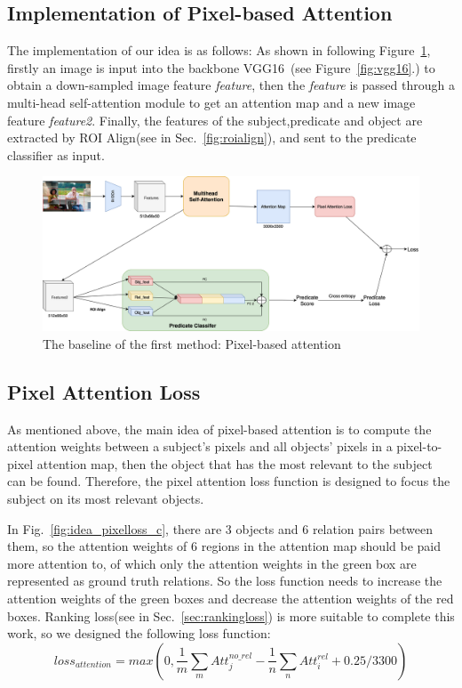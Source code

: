 \subsection{ Implementation of Pixel-based Attention}
The implementation of our idea is as follows: As shown in following Figure~\ref{fig:method1baseline}, firstly an image is input into the  backbone VGG16~\cite{simonyan2015deep}(see Figure~\ref{fig:vgg16}.) to obtain a down-sampled image feature \textit{feature},  then the \textit{feature} is passed through a multi-head self-attention module to get an attention map and a new image feature \textit{feature2}. Finally, the features of the subject,predicate and object are extracted by ROI Align(see in Sec.~\ref{fig:roialign}), and sent to the predicate classifier as input.


\begin{figure}[H]
	\centering
	\includegraphics[width=1\linewidth]{figures/method1_baseline}
	\caption[The baseline of the first method: Pixel-based attention]{The baseline of the  first method: Pixel-based attention}
	\label{fig:method1baseline}
\end{figure}

\subsection{Pixel  Attention Loss}
As mentioned above, the main idea of pixel-based attention is to compute the attention weights between a subject's pixels and all objects' pixels in a pixel-to-pixel attention map, then the object that has the most relevant to the subject can be found. Therefore, the pixel attention loss function is designed to focus the subject on its most relevant objects.

In Fig.~\ref{fig:idea_pixelloss_c}, there are 3 objects and 6 relation pairs between them, so the attention weights of 6 regions in the attention map should be paid more attention to, of which only the attention weights in the green box are represented as ground truth relations. So the loss function needs to increase the attention weights of the green boxes and decrease the attention weights of the red boxes. Ranking loss(see in Sec.~\ref{sec:rankingloss}) is more suitable to complete this work, so we designed the following loss function:
\begin{equation}\label{pixel_attention_loss}
	loss_{attention}=max(0, \frac{1}{m}\sum_{m}Att_j^{no\_rel}-\frac{1}{n}\sum_{n}Att_i^{rel}+0.25
	/3300)
\end{equation}

